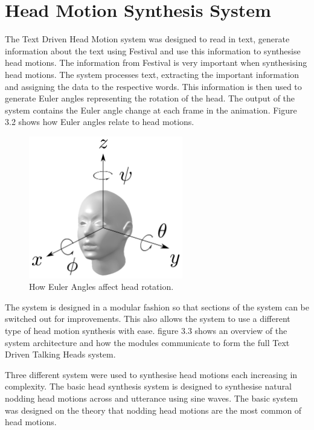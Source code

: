 \documentclass[bsc,frontabs,twoside,singlespacing,parskip]{infthesis}
\begin{document}
\section{Head Motion Synthesis System}

The Text Driven Head Motion system was designed to read in text, generate information about the text using Festival and use this information to synthesise head motions. The information from Festival is very important when synthesising head motions. The system processes text, extracting the important information and assigning the data to the respective words. This information is then used to generate Euler angles representing the rotation of the head. The output of the system contains the Euler angle change at each frame in the animation. Figure 3.2 shows how Euler angles relate to head motions.

\begin{figure}
	\centering
	\includegraphics[width=0.6\textwidth]{head_with_euler.png}
	\caption{How Euler Angles affect head rotation.}
\end{figure}

The system is designed in a modular fashion so that sections of the system can be switched out for improvements. This also allows the system to use a different type of head motion synthesis with ease. figure 3.3 shows an overview of the system architecture and how the modules communicate to form the full Text Driven Talking Heads system. 

Three different system were used to synthesise head motions each increasing in complexity. The basic head synthesis system is designed to synthesise natural nodding head motions across and utterance using sine waves. The basic system was designed on the theory that nodding head motions are the most common of head motions. \cite{first_paper}
\end{document}
